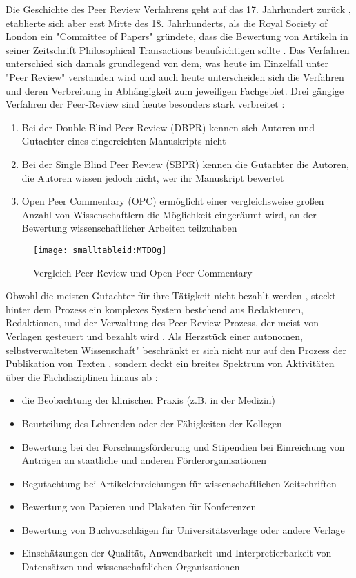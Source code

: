 Die Geschichte des Peer Review Verfahrens geht auf das 17. Jahrhundert zurück \cite{Kronick_1978}, etablierte sich aber erst Mitte des 18. Jahrhunderts, als die Royal Society of London ein "Committee of Papers" gründete, dass die Bewertung von Artikeln in seiner Zeitschrift Philosophical Transactions beaufsichtigen sollte \cite{Kronick_1990}. Das Verfahren unterschied sich damals grundlegend von dem, was heute im Einzelfall unter "Peer Review" verstanden wird und auch heute unterscheiden sich die Verfahren und deren Verbreitung in Abhängigkeit zum jeweiligen Fachgebiet. Drei gängige Verfahren der Peer-Review sind heute besonders stark verbreitet \cite{mueller_2009_peerreview}:
\begin{enumerate}
\item Bei der Double Blind Peer Review (DBPR) kennen sich Autoren und Gutachter eines eingereichten Manuskripts nicht
\item Bei der Single Blind Peer Review (SBPR) kennen die Gutachter die Autoren, die Autoren wissen jedoch nicht, wer ihr Manuskript bewertet
\item Open Peer Commentary (OPC) ermöglicht einer vergleichsweise großen Anzahl von Wissenschaftlern die Möglichkeit eingeräumt wird, an der Bewertung wissenschaftlicher Arbeiten teilzuhaben
\end{enumerate}

\begin{figure}[h!]
\texttt{[image: smalltableid:MTDOg]}
\caption{Vergleich Peer Review und Open Peer Commentary}
\end{figure}

Obwohl die meisten Gutachter für ihre Tätigkeit nicht bezahlt werden \cite{yiotis_2013_open}, steckt hinter dem Prozess ein komplexes System bestehend aus Redakteuren, Redaktionen, und der Verwaltung des Peer-Review-Prozess, der meist von Verlagen gesteuert und bezahlt wird \cite{Bargheer_2015} \cite{mueller_2009_peerreview} \cite{Baggs_2006}. Als Herzstück einer autonomen, selbstverwalteten Wissenschaft" \cite{suchen_Hornbostel_2006} beschränkt er sich nicht nur auf den Prozess der Publikation von Texten \cite{mueller_2009_peerreview}, sondern deckt ein breites Spektrum von Aktivitäten über die Fachdisziplinen hinaus ab \cite{Lee_2012}:
\begin{itemize}
\item die Beobachtung der klinischen Praxis (z.B. in der Medizin)
\item Beurteilung des Lehrenden oder der Fähigkeiten der Kollegen
\item Bewertung bei der Forschungsförderung und Stipendien bei Einreichung von Anträgen an staatliche und anderen Förderorganisationen
\item Begutachtung bei Artikeleinreichungen für wissenschaftlichen Zeitschriften
\item Bewertung von Papieren und Plakaten für Konferenzen
\item Bewertung von Buchvorschlägen für Universitätsverlage oder andere Verlage
\item Einschätzungen der Qualität, Anwendbarkeit und Interpretierbarkeit von Datensätzen und wissenschaftlichen Organisationen
\end{itemize}

